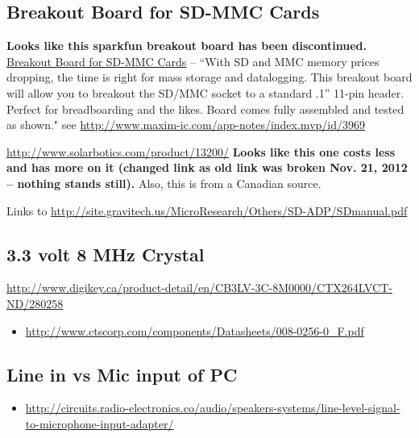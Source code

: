 \documentclass[twocolumn]{article}
\begin{document}
\subsection{Breakout Board for SD-MMC Cards}

\textbf{Looks like this sparkfun breakout board has been discontinued.}
\href{http://www.sparkfun.com/products/204}{Breakout Board for SD-MMC
Cards} -- ``With SD and MMC memory prices dropping, the time is right
for mass storage and datalogging. This breakout board will allow you to
breakout the SD/MMC socket to a standard .1'' 11-pin header. Perfect for
breadboarding and the likes. Board comes fully assembled and tested as
shown." see \url{http://www.maxim-ic.com/app-notes/index.mvp/id/3969}

\url{http://www.solarbotics.com/product/13200/} \textbf{Looks like this
one costs less and has more on it (changed link as old link was broken
Nov. 21, 2012 -- nothing stands still).} Also, this is from a Canadian
source.

Links to
\url{http://site.gravitech.us/MicroResearch/Others/SD-ADP/SDmanual.pdf}

\subsection{3.3 volt 8 MHz Crystal}

\url{http://www.digikey.ca/product-detail/en/CB3LV-3C-8M0000/CTX264LVCT-ND/280258}

\begin{itemize}
\item
  \url{http://www.ctscorp.com/components/Datasheets/008-0256-0_F.pdf}
\end{itemize}

\subsection{Line in vs Mic input of PC}

\begin{itemize}
\item
  \url{http://circuits.radio-electronics.co/audio/speakers-systems/line-level-signal-to-microphone-input-adapter/}
\end{itemize}
\end{document}

